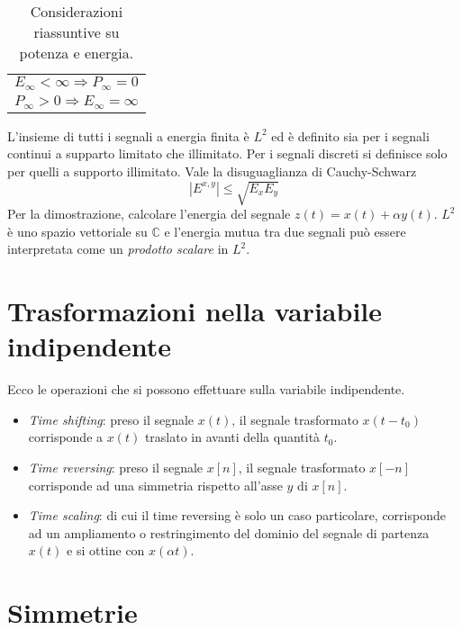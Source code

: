 \documentclass[a4paper,portrait,12pt]{article}
\theoremstyle{definition}
\begin{document}
\begin{table}[h]
\begin{center}
\begin{tabular}{l}
$E_{\infty} < \infty \Rightarrow P_{\infty} = 0$\\
$P_{\infty} > 0 \Rightarrow E_{\infty} = \infty$\\
\end{tabular}
\caption{Considerazioni riassuntive su potenza e energia.}
\end{center}
\end{table}

L'insieme di tutti i segnali a energia finita è $L^2$ ed è definito sia per i segnali continui a supparto 
limitato che illimitato. Per i segnali discreti si definisce solo per quelli a supporto illimitato. Vale la 
disuguaglianza di Cauchy-Schwarz
\begin{equation}
\left|E^{x,y}\right| \le \sqrt{E_x E_y}
\end{equation}
Per la dimostrazione, calcolare l'energia del segnale $z(t) = x(t) + \alpha y(t)$.
$L^2$ è uno spazio vettoriale su $\mathbb{C}$ e l'energia mutua tra due segnali può essere interpretata 
come un \textit{prodotto scalare} in $L^2$.
\bigskip


\section{Trasformazioni nella variabile indipendente}

Ecco le operazioni che si possono effettuare sulla variabile indipendente.
\begin{itemize}
\item \textit{Time shifting}: preso il segnale $x(t)$, il segnale trasformato $x(t-t_0)$ corrisponde a $x(t)$
	traslato in avanti della quantità $t_0$.
\item \textit{Time reversing}: preso il segnale $x[n]$, il segnale trasformato $x[-n]$ corrisponde ad una
	simmetria rispetto all'asse $y$ di $x[n]$.
\item \textit{Time scaling}: di cui il time reversing è solo un caso particolare, corrisponde ad un ampliamento
	o restringimento del dominio del segnale di partenza $x(t)$ e si ottine con $x(\alpha t)$. 
\end{itemize}
\bigskip


\section{Simmetrie}
\end{document}
